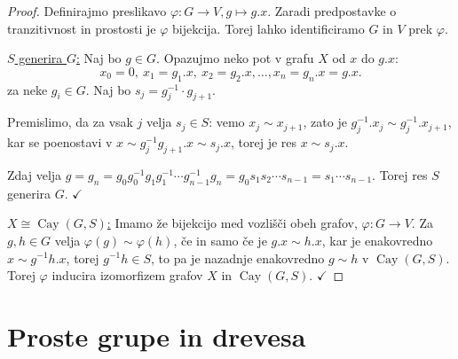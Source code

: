\documentclass[11pt]{book}
\DeclareMathOperator\Cay{Cay}
\def\kljuka{$\checkmark$}
\theoremstyle{definition}
\theoremstyle{zgled}
\theoremstyle{odprtproblem}
\theoremstyle{domacanaloga}
\newenvironment{dokaz}
    {\color{siva}\begin{proof}}
    {\end{proof}}
\theoremstyle{izrek}
\begin{document}
\begin{dokaz}
Definirajmo preslikavo $\varphi \colon G \to V, g \mapsto g.x$. Zaradi predpostavke o tranzitivnost in prostosti je $\varphi$ bijekcija. Torej lahko identificiramo $G$ in $V$ prek $\varphi$.

\underline{$S$ generira $G$:} Naj bo $g \in G$. Opazujmo neko pot v grafu $X$ od $x$ do $g.x$:
\[
x_0 = 0, \ x_1 = g_1.x, \ x_2 = g_2.x, \dots, x_n = g_n.x = g.x.
\]
za neke $g_i \in G$. Naj bo $s_j = g_j^{-1} \cdot g_{j+1}$. 

\begin{figure}[ht]
\centering
{}
\end{figure}

Premislimo, da za vsak $j$ velja $s_j \in S$: vemo $x_j \sim x_{j+1}$, zato je $g_j^{-1}.x_j \sim g_j^{-1}.x_{j+1}$, kar se poenostavi v $x \sim g_j^{-1}g_{j+1}.x \sim s_j.x$, torej je res $x \sim s_j.x$.

Zdaj velja $g = g_n = g_0 g_0^{-1} g_1 g_1^{-1} \cdots g_{n-1}^{-1} g_n = g_0 s_1 s_2 \cdots s_{n-1} = s_1 \cdots s_{n-1}$. Torej res $S$ generira $G$. \kljuka

\underline{$X \cong \Cay(G,S)$:} Imamo že bijekcijo med vozlišči obeh grafov, $\varphi \colon G \to V$. Za $g,h \in G$ velja $\varphi(g) \sim \varphi(h)$, če in samo če je $g.x \sim h.x$, kar je enakovredno $x \sim g^{-1}h.x$, torej $g^{-1}h \in S$, to pa je nazadnje enakovredno $g \sim h$ v $\Cay(G,S)$. Torej $\varphi$ inducira izomorfizem grafov $X$ in $\Cay(G,S)$. \kljuka
\end{dokaz}

\section{Proste grupe in drevesa}
\end{document}
